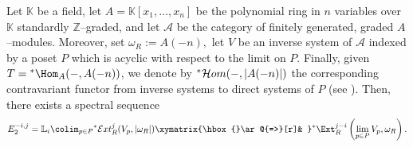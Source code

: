 \documentclass[11pt]{amsart}
\begin{document}
\begin{teo}
Let $\mathbb{K}$ be a field, let $A=\mathbb{K}[x_1,\ldots ,x_n]$ be the polynomial ring in $n$ variables over $\mathbb{K}$ standardly $\mathbb{Z}$--graded, and let $\mathcal{A}$ be the category of finitely generated, graded $A$--modules. Moreover, set $\omega_R:=A(-n),$ let $V$ be an inverse system of $\mathcal{A}$ indexed by a poset $P$ which is acyclic with respect to the limit on $P$. Finally, given $T=\hbox{}^*\Hom_A (-,A(-n))$, we denote by $\hbox{}^*\mathcal{H}om (-,\lvert A(-n)\rvert)$ the corresponding contravariant functor from inverse systems to direct systems of $P$ (see ). Then, there exists a spectral sequence
\[
E_2^{-i,j}=\mathbb{L}_i \colim_{p\in P} \hbox{}^*\mathcal{E}xt_R^j (V_p,\lvert \omega_R\rvert)\xymatrix{\hbox{}\ar@{=>}[r]& }\hbox{}^*\Ext_R^{j-i} \left(\lim_{p\in P}V_p,\omega_R\right).
\]
\end{teo}
\end{document}

